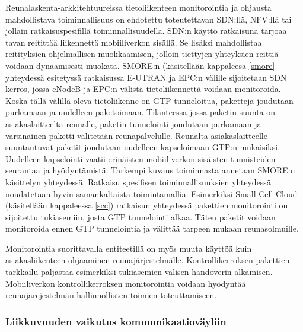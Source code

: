 Reunalaskenta-arkkitehtuureissa tietoliikenteen monitorointia ja ohjausta mahdollistava toiminnallisuus on ehdotettu toteutettavan SDN:llä, NFV:llä tai jollain ratkaisuspesifillä toiminnallisuudella. 
SDN:n käyttö ratkaisuna tarjoaa tavan reitittää liikennettä mobiiliverkon sisällä. Se lisäksi mahdollistaa reitityksien ohjelmallisen muokkaamisen, jolloin tiettyjen yhteyksien reittiä voidaan dynaamisesti muokata. SMORE:n (käsitellään kappaleesa \ref{smore} yhteydessä esitetyssä ratkaisussa  E-UTRAN ja EPC:n välille sijoitetaan SDN kerros, jossa eNodeB ja EPC:n välistä tietoliikennettä voidaan monitoroida. 
Koska tällä välillä oleva tietoliikenne on GTP tunneloitua, paketteja joudutaan purkamaan ja uudelleen paketoimaan. 
Tilanteessa jossa paketin suunta on asiakaslaitteelta reunalle, paketin tunnelointi joudutaan purkamaan ja varsinainen paketti välitetään reunapalvelulle. 
Reunalta asiakaslaitteelle suuntautuvat paketit joudutaan uudelleen kapseloimaan GTP:n mukaisiksi.
Uudelleen kapselointi vaatii erinäisten mobiiliverkon sisäisten tunnisteiden seurantaa ja hyödyntämistä.
Tarkempi kuvaus toiminnasta annetaan SMORE:n käsittelyn yhteydessä.
Ratkaisu spesifisen toiminnallisuuksien yhteydessä noudatetaan hyvin samankaltaista toimintamallia. Esimerkiksi Small Cell Cloud (käsitellään kappaleessa \ref{scc}) ratkaisun yhteydessä pakettien monitorointi on sijoitettu tukiasemiin, josta GTP tunnelointi alkaa.
Täten paketit voidaan monitoroida ennen GTP tunnelointia ja välittää tarpeen mukaan reunasolmuille.

Monitorointia suorittavalla entiteetillä on myös muuta käyttöä kuin asiakasliikenteen ohjaaminen reunajärjestelmälle.
Kontrollikerroksen pakettien tarkkailu paljastaa esimerkiksi tukiasemien välisen handoverin alkamisen.
Mobiiliverkon kontrollikerroksen monitorointia voidaan hyödyntää reunajärejestelmän hallinnollisten toimien toteuttamiseen.

\subsubsection*{Liikkuvuuden vaikutus kommunikaatioväyliin}

